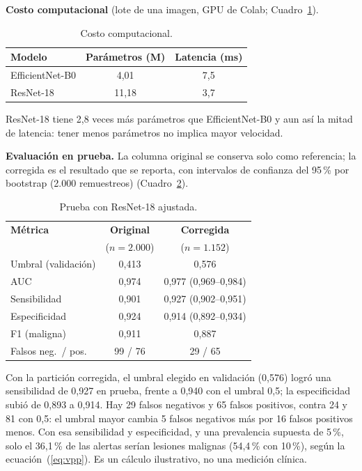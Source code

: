 \documentclass[conference]{IEEEtran}
\begin{document}
	\textbf{Costo computacional} (lote de una imagen, GPU de Colab; Cuadro~\ref{tab:costo}).
	
	\begin{table}[H]
		\centering
		\caption{Costo computacional.}
		\label{tab:costo}
		\begin{tabular}{@{}lcc@{}}
			\toprule
			\textbf{Modelo} & \textbf{Parámetros (M)} & \textbf{Latencia (ms)} \\
			\midrule
			EfficientNet-B0 & 4,01  & 7,5 \\
			ResNet-18       & 11,18 & 3,7 \\
			\bottomrule
		\end{tabular}
	\end{table}
	
	ResNet-18 tiene 2,8 veces más parámetros que EfficientNet-B0 y aun así la mitad de latencia: tener menos parámetros no implica mayor velocidad.
	
	\textbf{Evaluación en prueba.} La columna original se conserva solo como referencia; la corregida es el resultado que se reporta, con intervalos de confianza del 95\,\% por bootstrap (2.000 remuestreos) (Cuadro~\ref{tab:test}).
	
	\begin{table}[H]
		\centering
		\caption{Prueba con ResNet-18 ajustada.}
		\label{tab:test}
		\footnotesize
		\begin{tabular}{@{}lcc@{}}
			\toprule
			\textbf{Métrica} & \textbf{Original} & \textbf{Corregida} \\
			& ($n = 2.000$) & ($n = 1.152$) \\
			\midrule
			Umbral (validación)   & 0,413   & 0,576 \\
			AUC                   & 0,974   & 0,977 (0,969--0,984) \\
			Sensibilidad          & 0,901   & 0,927 (0,902--0,951) \\
			Especificidad         & 0,924   & 0,914 (0,892--0,934) \\
			F1 (maligna)          & 0,911   & 0,887 \\
			Falsos neg.\ / pos.   & 99 / 76 & 29 / 65 \\
			\bottomrule
		\end{tabular}
	\end{table}
	
	Con la partición corregida, el umbral elegido en validación (0,576) logró una sensibilidad de 0,927 en prueba, frente a 0,940 con el umbral 0,5; la especificidad subió de 0,893 a 0,914. Hay 29 falsos negativos y 65 falsos positivos, contra 24 y 81 con 0,5: el umbral mayor cambia 5 falsos negativos más por 16 falsos positivos menos. Con esa sensibilidad y especificidad, y una prevalencia supuesta de 5\,\%, solo el 36,1\,\% de las alertas serían lesiones malignas (54,4\,\% con 10\,\%), según la ecuación~(\ref{eq:vpp}). Es un cálculo ilustrativo, no una medición clínica.
	
\end{document}
